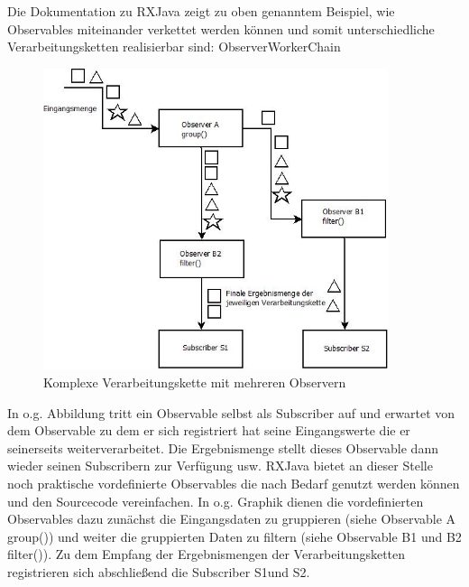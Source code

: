 \documentclass[12pt,oneside,a4paper,bibtotoc,liststotoc]{scrreprt}
\begin{document}
Die Dokumentation zu RXJava zeigt zu oben genanntem Beispiel, wie Observables miteinander verkettet werden können und somit unterschiedliche Verarbeitungsketten realisierbar sind:
ObserverWorkerChain
\begin{figure}[H]
  \begin{centering}
    \includegraphics[width=0.9\textwidth]{img/ObserverWorkerChain.jpeg}
    \caption{Komplexe Verarbeitungskette mit mehreren Observern}
    \label{ObserverWorkerChain}
  \end{centering}
\end{figure}
In o.g. Abbildung tritt ein Observable selbst als Subscriber auf und erwartet von dem Observable zu dem er sich registriert hat seine Eingangswerte die er seinerseits weiterverarbeitet. Die Ergebnismenge stellt dieses Observable dann wieder seinen Subscribern zur Verfügung usw. RXJava bietet an dieser Stelle noch praktische vordefinierte Observables die nach Bedarf genutzt werden können und den Sourcecode vereinfachen. In o.g. Graphik dienen die vordefinierten Observables dazu zunächst die Eingangsdaten zu gruppieren (siehe Observable A group()) und weiter die gruppierten Daten zu filtern (siehe Observable B1 und B2 filter()). Zu dem Empfang der Ergebnismengen der Verarbeitungsketten registrieren sich abschließend die Subscriber S1und S2.
\end{document}
